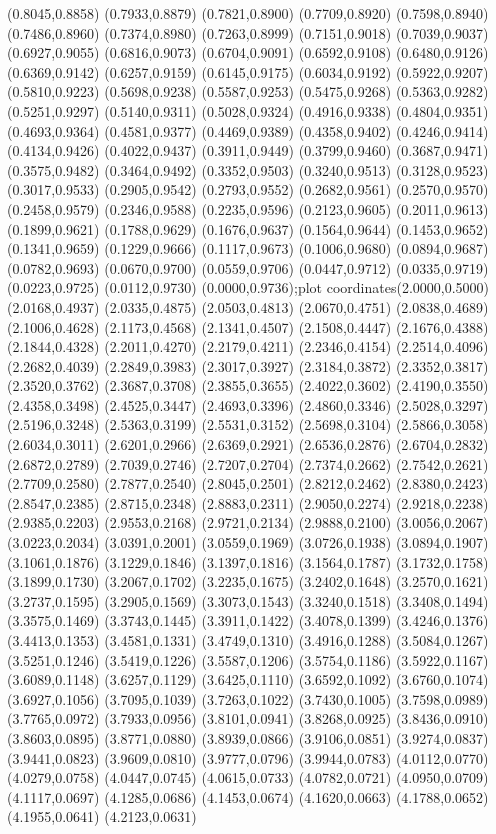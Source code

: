{(0.8045,0.8858) (0.7933,0.8879) (0.7821,0.8900) (0.7709,0.8920) (0.7598,0.8940) (0.7486,0.8960) (0.7374,0.8980) (0.7263,0.8999) (0.7151,0.9018) (0.7039,0.9037) (0.6927,0.9055) (0.6816,0.9073) (0.6704,0.9091) (0.6592,0.9108) (0.6480,0.9126) (0.6369,0.9142) (0.6257,0.9159) (0.6145,0.9175) (0.6034,0.9192) (0.5922,0.9207) (0.5810,0.9223) (0.5698,0.9238) (0.5587,0.9253) (0.5475,0.9268) (0.5363,0.9282) (0.5251,0.9297) (0.5140,0.9311) (0.5028,0.9324) (0.4916,0.9338) (0.4804,0.9351) (0.4693,0.9364) (0.4581,0.9377) (0.4469,0.9389) (0.4358,0.9402) (0.4246,0.9414) (0.4134,0.9426) (0.4022,0.9437) (0.3911,0.9449) (0.3799,0.9460) (0.3687,0.9471) (0.3575,0.9482) (0.3464,0.9492) (0.3352,0.9503) (0.3240,0.9513) (0.3128,0.9523) (0.3017,0.9533) (0.2905,0.9542) (0.2793,0.9552) (0.2682,0.9561) (0.2570,0.9570) (0.2458,0.9579) (0.2346,0.9588) (0.2235,0.9596) (0.2123,0.9605) (0.2011,0.9613) (0.1899,0.9621) (0.1788,0.9629) (0.1676,0.9637) (0.1564,0.9644) (0.1453,0.9652) (0.1341,0.9659) (0.1229,0.9666) (0.1117,0.9673) (0.1006,0.9680) (0.0894,0.9687) (0.0782,0.9693) (0.0670,0.9700) (0.0559,0.9706) (0.0447,0.9712) (0.0335,0.9719) (0.0223,0.9725) (0.0112,0.9730) (0.0000,0.9736)};plot coordinates{(2.0000,0.5000) (2.0168,0.4937) (2.0335,0.4875) (2.0503,0.4813) (2.0670,0.4751) (2.0838,0.4689) (2.1006,0.4628) (2.1173,0.4568) (2.1341,0.4507) (2.1508,0.4447) (2.1676,0.4388) (2.1844,0.4328) (2.2011,0.4270) (2.2179,0.4211) (2.2346,0.4154) (2.2514,0.4096) (2.2682,0.4039) (2.2849,0.3983) (2.3017,0.3927) (2.3184,0.3872) (2.3352,0.3817) (2.3520,0.3762) (2.3687,0.3708) (2.3855,0.3655) (2.4022,0.3602) (2.4190,0.3550) (2.4358,0.3498) (2.4525,0.3447) (2.4693,0.3396) (2.4860,0.3346) (2.5028,0.3297) (2.5196,0.3248) (2.5363,0.3199) (2.5531,0.3152) (2.5698,0.3104) (2.5866,0.3058) (2.6034,0.3011) (2.6201,0.2966) (2.6369,0.2921) (2.6536,0.2876) (2.6704,0.2832) (2.6872,0.2789) (2.7039,0.2746) (2.7207,0.2704) (2.7374,0.2662) (2.7542,0.2621) (2.7709,0.2580) (2.7877,0.2540) (2.8045,0.2501) (2.8212,0.2462) (2.8380,0.2423) (2.8547,0.2385) (2.8715,0.2348) (2.8883,0.2311) (2.9050,0.2274) (2.9218,0.2238) (2.9385,0.2203) (2.9553,0.2168) (2.9721,0.2134) (2.9888,0.2100) (3.0056,0.2067) (3.0223,0.2034) (3.0391,0.2001) (3.0559,0.1969) (3.0726,0.1938) (3.0894,0.1907) (3.1061,0.1876) (3.1229,0.1846) (3.1397,0.1816) (3.1564,0.1787) (3.1732,0.1758) (3.1899,0.1730) (3.2067,0.1702) (3.2235,0.1675) (3.2402,0.1648) (3.2570,0.1621) (3.2737,0.1595) (3.2905,0.1569) (3.3073,0.1543) (3.3240,0.1518) (3.3408,0.1494) (3.3575,0.1469) (3.3743,0.1445) (3.3911,0.1422) (3.4078,0.1399) (3.4246,0.1376) (3.4413,0.1353) (3.4581,0.1331) (3.4749,0.1310) (3.4916,0.1288) (3.5084,0.1267) (3.5251,0.1246) (3.5419,0.1226) (3.5587,0.1206) (3.5754,0.1186) (3.5922,0.1167) (3.6089,0.1148) (3.6257,0.1129) (3.6425,0.1110) (3.6592,0.1092) (3.6760,0.1074) (3.6927,0.1056) (3.7095,0.1039) (3.7263,0.1022) (3.7430,0.1005) (3.7598,0.0989) (3.7765,0.0972) (3.7933,0.0956) (3.8101,0.0941) (3.8268,0.0925) (3.8436,0.0910) (3.8603,0.0895) (3.8771,0.0880) (3.8939,0.0866) (3.9106,0.0851) (3.9274,0.0837) (3.9441,0.0823) (3.9609,0.0810) (3.9777,0.0796) (3.9944,0.0783) (4.0112,0.0770) (4.0279,0.0758) (4.0447,0.0745) (4.0615,0.0733) (4.0782,0.0721) (4.0950,0.0709) (4.1117,0.0697) (4.1285,0.0686) (4.1453,0.0674) (4.1620,0.0663) (4.1788,0.0652) (4.1955,0.0641) (4.2123,0.0631) }
